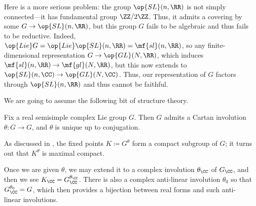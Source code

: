 \documentclass[../notes.tex]{subfiles}
\begin{document}
\begin{example}
	Here is a more serious problem: the group $\op{SL}(n,\RR)$ is not simply connected---it has fundamental group $\ZZ/2\ZZ$. Thus, it admits a covering by some $G\to\op{SL}(n,\RR)$, but this group $G$ fails to be algebraic and thus fails to be reductive. Indeed, $\op{Lie}G=\op{Lie}\op{SL}(n,\RR)=\mf{sl}(n,\RR)$, so any finite-dimensional representation $G\to\op{GL}(N,\RR)$, which induces $\mf{sl}(n,\RR)\to\mf{gl}(N,\RR)$, but this now extends to $\op{SL}(n,\CC)\to\op{GL}(N,\CC)$. Thus, our representation of $G$ factors through $\op{SL}(n,\RR)$ and thus cannot be faithful.
\end{example}
We are going to assume the following bit of structure theory.
\begin{theorem}[Cartan]
	Fix a real semisimple complex Lie group $G$. Then $G$ admits a Cartan involution $\theta\colon G\to G$, and $\theta$ is unique up to conjugation.
\end{theorem}
As discussed in , the fixed points $K\coloneqq G^\theta$ form a compact subgroup of $G$; it turns out that $K^\theta$ is maximal compact.
\begin{remark}
	Once we are given $\theta$, we may extend it to a complex involution $\theta_\CC$ of $G_\CC$, and then we see $K_\CC=G_\CC^{\theta_\CC}$. There is also a complex anti-linear involution $\theta_0$ so that $G_\CC^{\theta_0}=G$, which then provides a bijection between real forms and such anti-linear involutions.
\end{remark}
\end{document}

